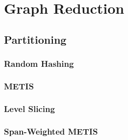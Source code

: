 \section{Graph Reduction}
\label{sec:method:reduction}

\subsection{Partitioning}
\label{sec:method:reduction:partitioning}

\subsubsection{Random Hashing}
\label{sec:method:partition:random}

\subsubsection{METIS}
\label{sec:method:partition:metis}

\subsubsection{Level Slicing}
\label{sec:method:partition:levelslice}

\subsubsection{Span-Weighted METIS}
\label{sec:method:partition:spanmetis}
